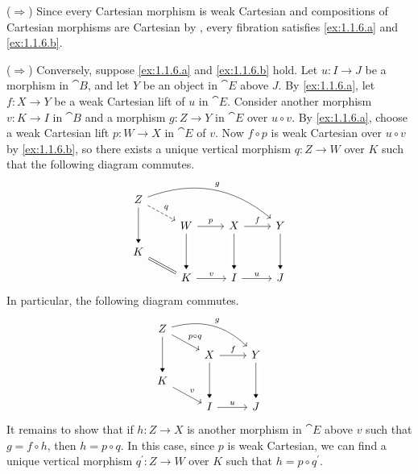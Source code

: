 \begin{solution}
(\(\Longrightarrow\))
Since every Cartesian morphism is weak Cartesian and compositions of Cartesian morphisms are Cartesian by , every fibration satisfies \ref{ex:1.1.6.a} and \ref{ex:1.1.6.b}.

(\(\Longrightarrow\))
Conversely, suppose \ref{ex:1.1.6.a} and \ref{ex:1.1.6.b} hold.
Let \(u : I \to J\) be a morphism in \(\cat{B}\), and let \(Y\) be an object in \(\cat{E}\) above \(J\).
By \ref{ex:1.1.6.a}, let \(f : X \to Y\) be a weak Cartesian lift of \(u\) in \(\cat{E}\).
Consider another morphism \(v : K \to I\) in \(\cat{B}\) and a morphism \(g : Z \to Y\) in \(\cat{E}\) over \(u \circ v\).
By \ref{ex:1.1.6.a}, choose a weak Cartesian lift \(p : W \to X\) in \(\cat{E}\) of \(v\).
Now \(f \circ p\) is weak Cartesian over \(u \circ v\) by \ref{ex:1.1.6.b}, so there exists a unique vertical morphism \(q : Z \to W\) over \(K\) such that the following diagram commutes.
\begin{equation*}
\begin{tikzcd}[row sep=small]
Z \arrow[rd, dashed, "q"] \arrow[rrrd, bend left, "g"] \arrow[dd, -Triangle] \\
& W \arrow[r, "p"] & X \arrow[r, "f"] & Y \\
K \arrow[rd, equal] \\
& K \arrow[r, "v"] & I \arrow[r, "u"] & J
\arrow[from=uull, to=ll, -Triangle, crossing over]
\arrow[from=uul, to=l, -Triangle, crossing over]
\arrow[from=uu, -Triangle, crossing over]
\end{tikzcd}
\end{equation*}
In particular, the following diagram commutes.
\begin{equation*}
\begin{tikzcd}[row sep=small]
Z \arrow[rd, "p \circ q"] \arrow[rrd, bend left, "g"] \arrow[dd, -Triangle] \\
& X \arrow[r, "f"] & Y \\
K \arrow[rd, "v"] \\
& I \arrow[r, "u"] & J
\arrow[from=uul, to=l, -Triangle, crossing over]
\arrow[from=uu, -Triangle, crossing over]
\end{tikzcd}
\end{equation*}
It remains to show that if \(h : Z \to X\) is another morphism in \(\cat{E}\) above \(v\) such that \(g = f \circ h\), then \(h = p \circ q\).
In this case, since \(p\) is weak Cartesian, we can find a unique vertical morphism \(q^\prime : Z \to W\) over \(K\) such that \(h = p \circ q^\prime\).

\end{solution}
